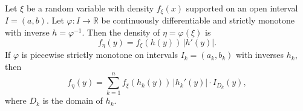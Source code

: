 Let $\xi$ be a random variable with density $f_\xi(x)$ supported on an open interval $I = (a,b)$. Let $\varphi: I \to \mathbb{R}$ be continuously differentiable and strictly monotone with inverse $h = \varphi^{-1}$. Then the density of $\eta = \varphi(\xi)$ is
$$f_\eta(y) = f_\xi(h(y)) \, |h'(y)|.$$
If $\varphi$ is piecewise strictly monotone on intervals $I_k = (a_k, b_k)$ with inverses $h_k$, then
$$f_\eta(y) = \sum_{k=1}^{n} f_\xi(h_k(y)) \, |h_k'(y)| \cdot I_{D_k}(y),$$
where $D_k$ is the domain of $h_k$.
